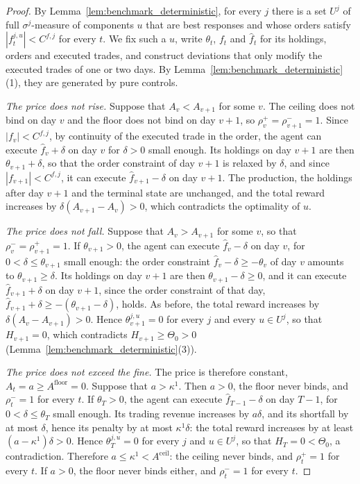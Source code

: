     \begin{proof}
        By Lemma~\ref{lem:benchmark_deterministic}, for every $j$ there is a set $U^j$ of full $\sigma^j$-measure of components $u$ that are best responses and whose orders satisfy $|f^{j,u}_t| < C^{f,j}$ for every $t$. We fix such a $u$, write $\theta_t$, $f_t$ and $\hat f_t$ for its holdings, orders and executed trades, and construct deviations that only modify the executed trades of one or two days. By Lemma~\ref{lem:benchmark_deterministic}(1), they are generated by pure controls.

        \emph{The price does not rise.} Suppose that $A_v < A_{v+1}$ for some $v$. The ceiling does not bind on day $v$ and the floor does not bind on day $v+1$, so $\rho^+_v = \rho^-_{v+1} = 1$. Since $|f_v| < C^{f,j}$, by continuity of the executed trade in the order, the agent can execute $\hat f_v + \delta$ on day $v$ for $\delta > 0$ small enough. Its holdings on day $v+1$ are then $\theta_{v+1} + \delta$, so that the order constraint of day $v+1$ is relaxed by $\delta$, and since $|f_{v+1}| < C^{f,j}$, it can execute $\hat f_{v+1} - \delta$ on day $v+1$. The production, the holdings after day $v+1$ and the terminal state are unchanged, and the total reward increases by $\delta (A_{v+1} - A_v) > 0$, which contradicts the optimality of $u$.

        \emph{The price does not fall.} Suppose that $A_v > A_{v+1}$ for some $v$, so that $\rho^-_v = \rho^+_{v+1} = 1$. If $\theta_{v+1} > 0$, the agent can execute $\hat f_v - \delta$ on day $v$, for $0 < \delta \le \theta_{v+1}$ small enough: the order constraint $\hat f_v - \delta \ge -\theta_v$ of day $v$ amounts to $\theta_{v+1} \ge \delta$. Its holdings on day $v+1$ are then $\theta_{v+1} - \delta \ge 0$, and it can execute $\hat f_{v+1} + \delta$ on day $v+1$, since the order constraint of that day, $\hat f_{v+1} + \delta \ge -(\theta_{v+1} - \delta)$, holds. As before, the total reward increases by $\delta (A_v - A_{v+1}) > 0$. Hence $\theta^{j,u}_{v+1} = 0$ for every $j$ and every $u \in U^j$, so that $H_{v+1} = 0$, which contradicts $H_{v+1} \ge \Theta_0 > 0$ (Lemma~\ref{lem:benchmark_deterministic}(3)).

        \emph{The price does not exceed the fine.} The price is therefore constant, $A_t = a \ge A^{\mathrm{floor}} = 0$. Suppose that $a > \kappa^1$. Then $a > 0$, the floor never binds, and $\rho^-_t = 1$ for every $t$. If $\theta_T > 0$, the agent can execute $\hat f_{T-1} - \delta$ on day $T-1$, for $0 < \delta \le \theta_T$ small enough. Its trading revenue increases by $a \delta$, and its shortfall by at most $\delta$, hence its penalty by at most $\kappa^1 \delta$: the total reward increases by at least $(a - \kappa^1) \delta > 0$. Hence $\theta^{j,u}_T = 0$ for every $j$ and $u \in U^j$, so that $H_T = 0 < \Theta_0$, a contradiction. Therefore $a \le \kappa^1 < A^{\mathrm{ceil}}$: the ceiling never binds, and $\rho^+_t = 1$ for every $t$. If $a > 0$, the floor never binds either, and $\rho^-_t = 1$ for every $t$.
    \end{proof}

